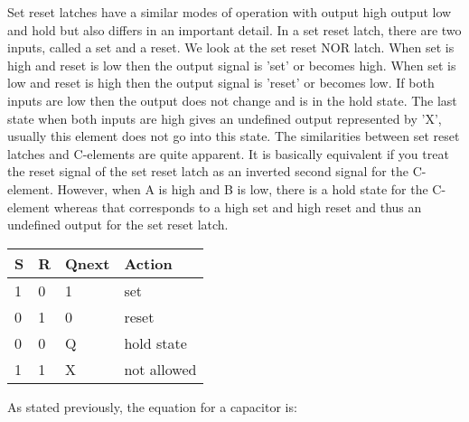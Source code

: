 \documentclass{article}
\begin{document}
\newline
Set reset latches have a similar modes of operation with output high output low and hold but also differs in an important detail.  In a set reset latch, there are two inputs, called a set and a reset.  We look at the set reset NOR latch.  When set is high and reset is low then the output signal is 'set' or becomes high.  When set is low and reset is high then the output signal is 'reset' or becomes low.  If both inputs are low then the output does not change and is in the hold state.  The last state when both inputs are high gives an undefined output represented by 'X', usually this element does not go into this state.  The similarities between set reset latches and C-elements are quite apparent.  It is basically equivalent if you treat the reset signal of the set reset latch as an inverted second signal for the C-element.  However, when A is high and B is low, there is a hold state for the C-element whereas that corresponds to a high set and high reset and thus an undefined output for the set reset latch.
\begin{center}

\begin{tabular}{|p{1.5cm}|p{1.5cm}|p{1.5cm}|p{2cm}| } 
 \hline
\textbf{S} & \textbf{R} & \textbf{Qnext} & \textbf{Action} \\
\hline
1 & 0 & 1 & set \\
\hline
0 & 1 & 0 & reset \\ 
\hline
0 & 0 & Q & hold state \\ 
\hline
1 & 1 & X & not allowed\\ 
\hline
\end{tabular}

\end{center}
As stated previously, the equation for a capacitor is:
\end{document}
